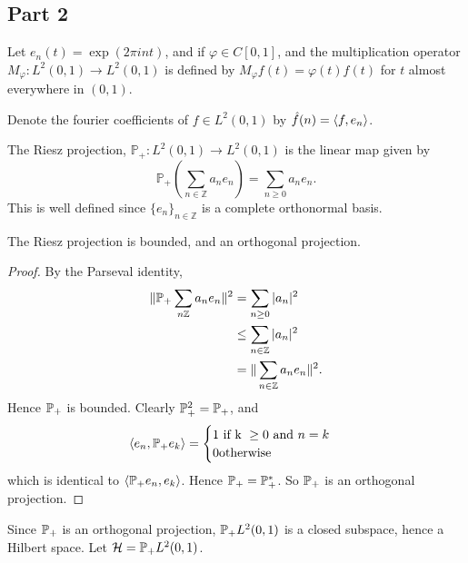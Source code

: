 \documentclass{unswmaths}
\begin{document}
\subsection*{Part 2}
\begin{definition}
    Let $e_n(t) = \exp(2\pi i n t)$, and if $\varphi \in C[0,1]$,
    and the multiplication operator $M_\varphi:L^2(0,1)\rightarrow L^2(0,1)$ is defined by $M_\varphi f(t) = \varphi(t)f(t)$
    for $t$ almost everywhere in $(0,1)$.    
    
    Denote the fourier coefficients of $f \in L^2(0,1)$ by $\hat{f}(n) = \langle f,e_n\rangle$.
\end{definition}
\begin{definition}
    The Riesz projection, $\mathbb{P}_+:L^2(0,1)\rightarrow L^2(0,1)$ is the linear map given by
    \begin{equation*}
        \mathbb{P}_+\left(\sum_{n\in\mathbb{Z}} a_ne_n\right) = \sum_{n\geq 0} a_ne_n.
    \end{equation*}
    This is well defined since $\{e_n\}_{n\in \mathbb{Z}}$ is a complete orthonormal basis.
\end{definition}
\begin{lemma}
    The Riesz projection is bounded, and an orthogonal projection.
\end{lemma}
\begin{proof}
    By the Parseval identity,
    \begin{align*}
        \| \mathbb{P}_+ \sum_{n\mathbb{Z}} a_n e_n\|^2 &= \sum_{n\geq 0} |a_n|^2\\
        &\leq \sum_{n\in\mathbb{Z}}|a_n|^2\\
        &= \|\sum_{n\in\mathbb{Z}} a_ne_n\|^2.
    \end{align*}
    Hence $\mathbb{P}_+$ is bounded.
    Clearly $\mathbb{P}_+^2 = \mathbb{P}_+$, and 
    \begin{equation*}
        \langle e_n,\mathbb{P}_+ e_k\rangle = \begin{cases}
            1\text{ if k }\geq 0\text{ and }n = k\\
            0\text{otherwise}
        \end{cases}
    \end{equation*}
    which is identical to $\langle\mathbb{P}_+ e_n,e_k\rangle$. Hence $\mathbb{P}_+ = \mathbb{P}_+^*$.    
    So $\mathbb{P}_+$ is an orthogonal projection.
\end{proof}
\begin{definition}
    Since $\mathbb{P}_+$ is an orthogonal projection, $\mathbb{P}_+ L^2(0,1)$ is a closed
    subspace, hence a Hilbert space. Let $\mathcal{H} = \mathbb{P}_+ L^2(0,1)$. 
\end{definition}
\end{document}
